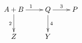 \documentclass[aspectratio=169,12pt,t]{ctexbeamer}
\begin{document}
\begin{frame}
    

    \[
        \xymatrix{
            A + B \ar[d]_{2} \ar[r]^{1} & Q \ar[r]^{3} \ar[d]^{4} & P  \\
            Z  & Y & 
            } 
    \]  

\end{frame}
\end{document}
